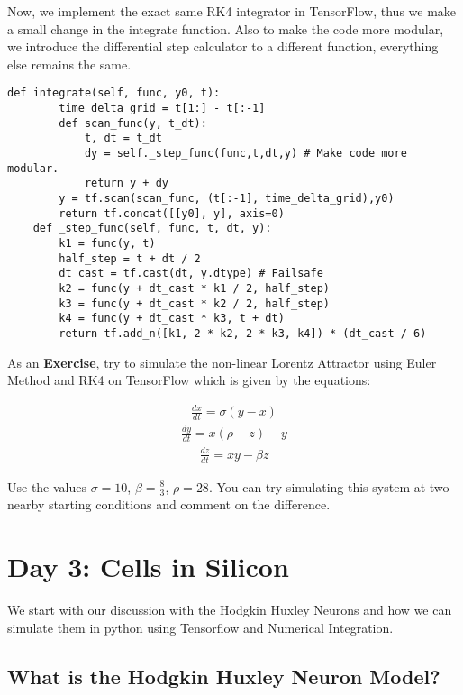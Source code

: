 \documentclass[10pt,letterpaper]{article}
\begin{document}
Now, we implement the exact same RK4 integrator in TensorFlow, thus we make a small change in the integrate function. Also to make the code more modular, we introduce the differential step calculator to a different function, everything else remains the same.

\begin{verbatim}
def integrate(self, func, y0, t): 
        time_delta_grid = t[1:] - t[:-1]
        def scan_func(y, t_dt): 
            t, dt = t_dt
            dy = self._step_func(func,t,dt,y) # Make code more modular.
            return y + dy
        y = tf.scan(scan_func, (t[:-1], time_delta_grid),y0)
        return tf.concat([[y0], y], axis=0)
    def _step_func(self, func, t, dt, y):
        k1 = func(y, t)
        half_step = t + dt / 2
        dt_cast = tf.cast(dt, y.dtype) # Failsafe
        k2 = func(y + dt_cast * k1 / 2, half_step)
        k3 = func(y + dt_cast * k2 / 2, half_step)
        k4 = func(y + dt_cast * k3, t + dt)
        return tf.add_n([k1, 2 * k2, 2 * k3, k4]) * (dt_cast / 6)
\end{verbatim}

As an \textbf{Exercise}, try to simulate the non-linear Lorentz Attractor using Euler Method and RK4 on TensorFlow which is given by the equations:

\begin{eqnarray}\frac{dx}{dt}=\sigma(y-x) \end{eqnarray}
\begin{eqnarray}\frac{dy}{dt}=x(\rho-z)-y \end{eqnarray}
\begin{eqnarray}\frac{dz}{dt}=xy-\beta z \end{eqnarray}

Use the values $\sigma =10$, $\beta =\frac{8}{3}$, $\rho =28$. You can try simulating this system at two nearby starting conditions and comment on the difference.

\section*{Day 3: Cells in Silicon}

We start with our discussion with the Hodgkin Huxley Neurons and how we can simulate them in python using Tensorflow and Numerical Integration.

\subsection*{What is the Hodgkin Huxley Neuron Model?}
\end{document}
